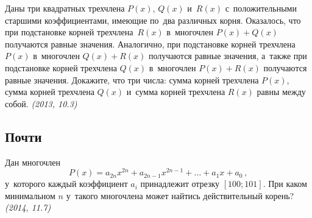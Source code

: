\begin{problems}

\item
Даны три квадратных трехчлена $P(x)$, $Q(x)$ и~$R(x)$ с~положительными старшими
коэффициентами, имеющие по~два различных корня.
Оказалось, что при подстановке корней трехчлена~$R(x)$ в~многочлен
$P(x) + Q(x)$ получаются равные значения.
Аналогично, при подстановке корней трехчлена $P(x)$ в~многочлен $Q(x) + R(x)$
получаются равные значения, а~также при подстановке корней трехчлена $Q(x)$
в~многочлен $P(x) + R(x)$ получаются равные значения.
Докажите, что три числа:
сумма корней трехчлена $P(x)$, сумма корней трехчлена $Q(x)$ и~сумма
корней трехчлена $R(x)$ равны между собой.
\emph{(2013, 10.3)}

\end{problems}

\subsection*{Почти}

\begin{problems}

\item
Дан многочлен
\[
    P(x) = a_{2n} x^{2n} + a_{2n-1} x^{2n-1} + \ldots + a_{1} x + a_{0}
\, , \]
у~которого каждый коэффициент $a_{i}$ принадлежит отрезку $[100; 101]$.
При каком минимальном $n$ у~такого многочлена может найтись действительный
корень?
\emph{(2014, 11.7)}

\end{problems}

